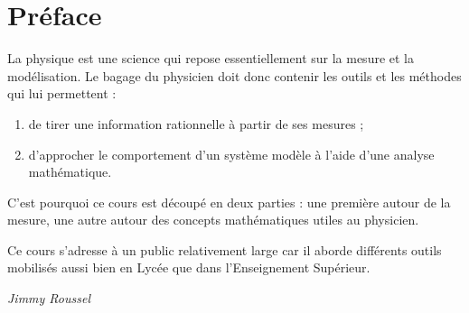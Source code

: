\chapter*{Préface}
La physique est une science qui repose essentiellement sur la mesure et la modélisation. Le bagage du physicien doit donc contenir les outils et les méthodes qui lui permettent :
\begin{enumerate}
	\item de tirer une information rationnelle à partir de ses mesures ;
	\item d'approcher le comportement d'un système modèle à l'aide d'une analyse mathématique.
\end{enumerate}
C'est pourquoi ce cours est découpé en deux parties : une première autour de la mesure, une autre autour des concepts mathématiques utiles au physicien.

Ce cours s'adresse à un public relativement large car il aborde différents outils mobilisés aussi bien en Lycée que dans l'Enseignement Supérieur.

\begin{flushright}
	\textit{Jimmy Roussel}
\end{flushright}
